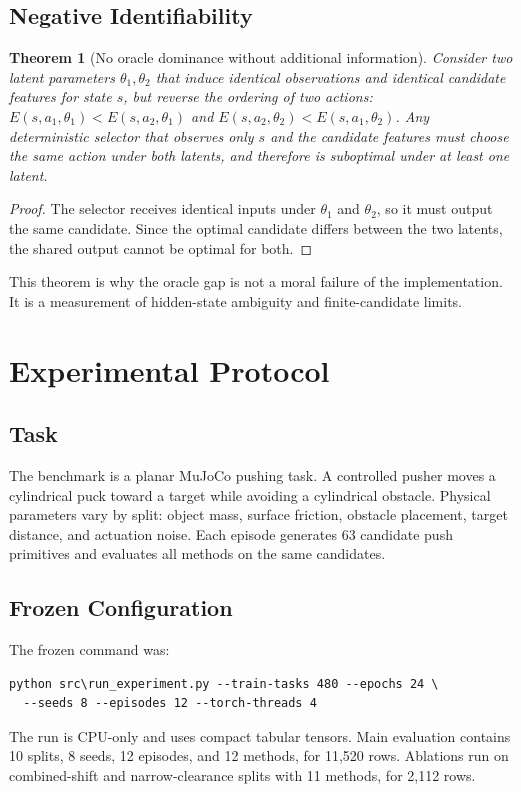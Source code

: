 \documentclass{article}
\newtheorem{theorem}{Theorem}
\newcommand{\latent}{\theta}
\newcommand{\energy}{E}
\begin{document}
\subsection{Negative Identifiability}

\begin{theorem}[No oracle dominance without additional information]
Consider two latent parameters $\latent_1,\latent_2$ that induce identical observations and identical candidate features for state $s$, but reverse the ordering of two actions: $\energy(s,a_1,\latent_1)<\energy(s,a_2,\latent_1)$ and $\energy(s,a_2,\latent_2)<\energy(s,a_1,\latent_2)$.  Any deterministic selector that observes only $s$ and the candidate features must choose the same action under both latents, and therefore is suboptimal under at least one latent.
\end{theorem}

\begin{proof}
The selector receives identical inputs under $\latent_1$ and $\latent_2$, so it must output the same candidate.  Since the optimal candidate differs between the two latents, the shared output cannot be optimal for both.
\end{proof}

This theorem is why the oracle gap is not a moral failure of the implementation.  It is a measurement of hidden-state ambiguity and finite-candidate limits.

\section{Experimental Protocol}

\subsection{Task}

The benchmark is a planar MuJoCo pushing task.  A controlled pusher moves a cylindrical puck toward a target while avoiding a cylindrical obstacle.  Physical parameters vary by split: object mass, surface friction, obstacle placement, target distance, and actuation noise.  Each episode generates 63 candidate push primitives and evaluates all methods on the same candidates.

\subsection{Frozen Configuration}

The frozen command was:
\begin{verbatim}
python src\run_experiment.py --train-tasks 480 --epochs 24 \
  --seeds 8 --episodes 12 --torch-threads 4
\end{verbatim}
The run is CPU-only and uses compact tabular tensors.  Main evaluation contains 10 splits, 8 seeds, 12 episodes, and 12 methods, for 11,520 rows.  Ablations run on combined-shift and narrow-clearance splits with 11 methods, for 2,112 rows.
\end{document}
